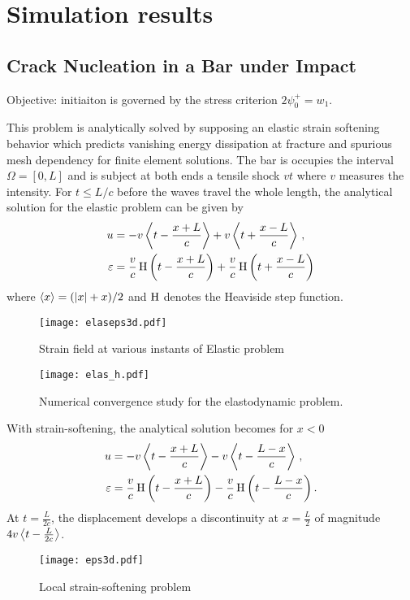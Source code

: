 \chapter{Simulation results}
\minitoc

\section{Crack Nucleation in a Bar under Impact} \label{sec:1d}
Objective: initiaiton is governed by the stress criterion $2\psi_0^+=w_1$.

This problem is analytically solved by supposing an elastic strain softening behavior \cite{Bazant:1985aa} which predicts vanishing energy dissipation at fracture and spurious mesh dependency for finite element solutions. The bar is occupies the interval $\Omega=[0,L]$ and is subject at both ends a tensile shock $vt$ where $v$ measures the intensity. For $t\leq L/c$ before the waves travel the whole length, the analytical solution for the elastic problem can be given by
\begin{align}
u &= -v\Braket{t-\frac{x+L}{c}}+v\Braket{t+\frac{x-L}{c}}\,, \\
\varepsilon &= \frac{v}{c}\operatorname{H}\left(t-\frac{x+L}{c}\right)+\frac{v}{c}\operatorname{H}\left(t+\frac{x-L}{c}\right) \label{eq:epselas}
\end{align}
where $\Braket{x}=(\left\lvert{x}\right\rvert+x)/2$ and $\operatorname{H}$ denotes the Heaviside step function.
\begin{figure}[htbp]
\centering
\texttt{[image: elaseps3d.pdf]}
\caption{Strain field at various instants of Elastic problem}
\end{figure}
\begin{figure}[htbp]
\centering
\texttt{[image: elas\_h.pdf]}
\caption{Numerical convergence study for the elastodynamic problem.}
\end{figure}

With strain-softening, the analytical solution becomes for $x<0$
\begin{align}
u &= -v\Braket{t-\frac{x+L}{c}}-v\Braket{t-\frac{L-x}{c}}\,, \\
\varepsilon &= \frac{v}{c}\operatorname{H}\left(t-\frac{x+L}{c}\right)-\frac{v}{c}\operatorname{H}\left(t-\frac{L-x}{c}\right). \label{eq:epselas}
\end{align}
At $t=\frac{L}{2c}$, the displacement develops a discontinuity at $x=\frac{L}{2}$ of magnitude $4v\Braket{t-\frac{L}{2c}}$.
\begin{figure}[htbp]
\centering
\texttt{[image: eps3d.pdf]}
\caption{Local strain-softening problem}
\end{figure}

